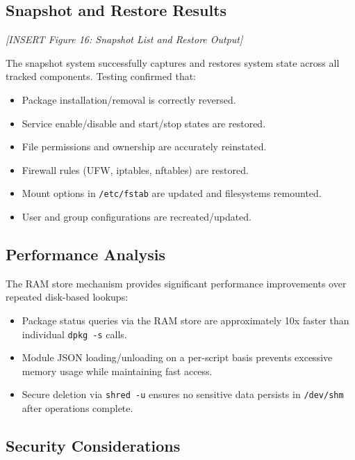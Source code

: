\subsection{Snapshot and Restore Results}

\vspace{0.5cm}
\noindent\textit{[INSERT Figure 16: Snapshot List and Restore Output]}
\vspace{0.5cm}

The snapshot system successfully captures and restores system state across all tracked components. Testing confirmed that:
\begin{itemize}[noitemsep]
    \item Package installation/removal is correctly reversed.
    \item Service enable/disable and start/stop states are restored.
    \item File permissions and ownership are accurately reinstated.
    \item Firewall rules (UFW, iptables, nftables) are restored.
    \item Mount options in \texttt{/etc/fstab} are updated and filesystems remounted.
    \item User and group configurations are recreated/updated.
\end{itemize}

\subsection{Performance Analysis}

The RAM store mechanism provides significant performance improvements over repeated disk-based lookups:

\begin{itemize}[noitemsep]
    \item Package status queries via the RAM store are approximately 10x faster than individual \texttt{dpkg -s} calls.
    \item Module JSON loading/unloading on a per-script basis prevents excessive memory usage while maintaining fast access.
    \item Secure deletion via \texttt{shred -u} ensures no sensitive data persists in \texttt{/dev/shm} after operations complete.
\end{itemize}

\subsection{Security Considerations}

